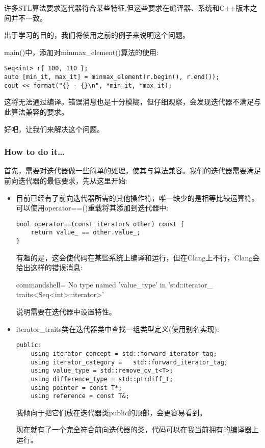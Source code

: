 
许多STL算法要求迭代器符合某些特征,但这些要求在编译器、系统和C++版本之间并不一致。

出于学习的目的，我们将使用之前的例子来说明这个问题。

main()中，添加对minmax\_element()算法的使用:

\begin{lstlisting}[style=styleCXX]
Seq<int> r{ 100, 110 };
auto [min_it, max_it] = minmax_element(r.begin(), r.end());
cout << format("{} - {}\n", *min_it, *max_it);
\end{lstlisting}

这将无法通过编译。错误消息也是十分模糊，但仔细观察，会发现迭代器不满足与此算法兼容的要求。

好吧，让我们来解决这个问题。

\subsubsection{How to do it…}

首先，需要对迭代器做一些简单的处理，使其与算法兼容。我们的迭代器需要满足前向迭代器的最低要求，先从这里开始:

\begin{itemize}
\item 
目前已经有了前向迭代器所需的其他操作符，唯一缺少的是相等比较运算符。可以使用operator==()重载将其添加到迭代器中:

\begin{lstlisting}[style=styleCXX]
bool operator==(const iterator& other) const {
	return value_ == other.value_;
}
\end{lstlisting}

有趣的是，这会使代码在某些系统上编译和运行，但在Clang上不行，Clang会给出这样的错误消息:

\begin{tcblisting}{commandshell={}}
No type named 'value_type' in 'std::iterator_
traits<Seq<int>::iterator>'
\end{tcblisting}

说明需要在迭代器中设置特性。

\item 
iterator\_traits类在迭代器类中查找一组类型定义(使用别名实现):

\begin{lstlisting}[style=styleCXX]
public:
	using iterator_concept = std::forward_iterator_tag;
	using iterator_category =	std::forward_iterator_tag;
	using value_type = std::remove_cv_t<T>;
	using difference_type = std::ptrdiff_t;
	using pointer = const T*;
	using reference = const T&;
\end{lstlisting}

我倾向于把它们放在迭代器类public的顶部，会更容易看到。

现在就有了一个完全符合前向迭代器的类，代码可以在我当前拥有的编译器上运行。

\end{itemize}

